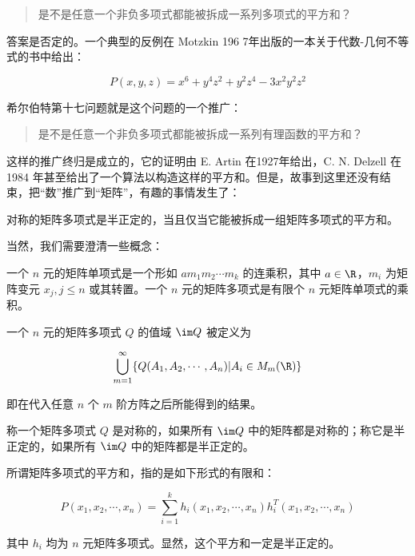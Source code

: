 \begin{quote}
\kaishu
是不是任意一个非负多项式都能被拆成一系列多项式的平方和？
\end{quote}

答案是否定的。一个典型的反例在 Motzkin 196 7年出版的一本关于代数-几何不等式的书中给出：

\[
P(x, y, z) = x^6 + y^4z^2 + y^2z^4 -3x^2y^2z^2
\]

希尔伯特第十七问题就是这个问题的一个推广：

\begin{quote}
\kaishu
是不是任意一个非负多项式都能被拆成一系列有理函数的平方和？
\end{quote}

这样的推广终归是成立的，它的证明由 E. Artin 在1927年给出，C. N. Delzell 在 1984 年甚至给出了一个算法以构造这样的平方和。但是，故事到这里还没有结束，把“数”推广到“矩阵”，有趣的事情发生了：

\begin{theorem}[Helton, 2002]\label{helton2002}
    对称的矩阵多项式是半正定的，当且仅当它能被拆成一组矩阵多项式的平方和。
\end{theorem}

当然，我们需要澄清一些概念：

\begin{definition}
    一个 $n$ 元的矩阵单项式是一个形如 $am_1m_2 \cdots m_k$ 的连乘积，其中 $a \in \R$，$m_i$ 为矩阵变元 $x_j, j \leqslant n$ 或其转置。一个 $n$ 元的矩阵多项式是有限个 $n$ 元矩阵单项式的乘积。
\end{definition}

\begin{definition}
    一个 $n$ 元的矩阵多项式 $Q$ 的值域 $\im Q$ 被定义为

    \[
    \bigcup_{m = 1}^\infty\{Q(A_1, A_2, \cdots, A_n) | A_i \in M_m(\R)\}
    \]

    即在代入任意 $n$ 个 $m$ 阶方阵之后所能得到的结果。
\end{definition}

\begin{definition}
    称一个矩阵多项式 $Q$ 是对称的，如果所有 $\im Q$ 中的矩阵都是对称的；称它是半正定的，如果所有 $\im Q$ 中的矩阵都是半正定的。
\end{definition}

\begin{definition}
    所谓矩阵多项式的平方和，指的是如下形式的有限和：

    \[
    P(x_1, x_2, \cdots, x_n) = \sum_{i = 1}^k h_i(x_1, x_2, \cdots, x_n)h_i^T(x_1, x_2, \cdots, x_n)
    \]

    其中 $h_i$ 均为 $n$ 元矩阵多项式。显然，这个平方和一定是半正定的。
\end{definition}

